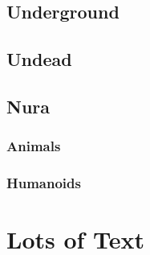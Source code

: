 \documentclass[a4paper,openany]{book}
\begin{document}
\begin{multicols}{2}

\bear

\boar

\huntingdog

\cat

\chitincrawler

\basilisk

\end{multicols}

\section{Underground}

\begin{multicols}{2}

\umberhulk

\jelly

\jelly

\jelly

\jelly

\end{multicols}

\section{Undead}

\begin{multicols}{2}

\ghoul

\ghast

\demilich

\lich

\end{multicols}

\section{Nura}

\begin{multicols}{2}

\subsection{Animals}

\nurahorse

\nuracrab

\nuracat

\nuraslug

\nuraspider

\nurawolf

\subsection{Humanoids}

\goblin

\goblinnuramancer

\hobgoblin

\ogre

\end{multicols}


\chapter{Lots of Text}

\begin{multicols}{2}

\noindent
\lipsum


\end{multicols}
\end{document}
